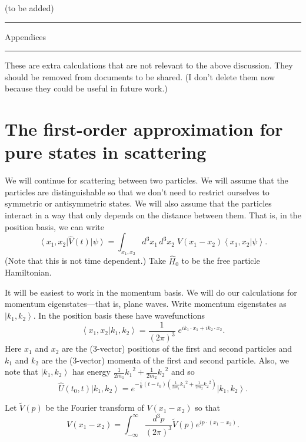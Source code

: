 \documentclass[11pt]{article}
\newcommand{\bra}[1]{\left\langle#1\right|}
\newcommand{\ket}[1]{\left|#1\right\rangle}
\newcommand{\braket}[2]{\left\langle#1|#2\right\rangle}
\newcommand{\op}[1]{\hat{#1}}
\theoremstyle{theorem}
\theoremstyle{remark}
\theoremstyle{step}
\theoremstyle{gap}
\begin{document}
(to be added)


\appendix
\newpage
\hrule
\vspace{3em}
{\Huge Appendices}
\vspace{3em}
\hrule
\vspace{2em}

These are extra calculations that are not relevant to the above discussion. They should be removed from documents to be shared. (I don't delete them now because they could be useful in future work.)


\section{The first-order approximation for pure states in scattering}

We will continue for scattering between two particles. We will assume that the particles are distinguishable so that we don't need to restrict ourselves to symmetric or antisymmetric states. We will also assume that the particles interact in a way that only depends on the distance between them. That is, in the position basis, we can write
\begin{equation}\label{eq.Vposbasis}
\bra{x_1, x_2}\op{V}(t)\ket{\psi} = \int_{x_1,x_2} {d^3 x_1 \,d^3x_2}\; V(x_1 - x_2) \braket{x_1, x_2}{\psi}.
\end{equation}
(Note that this is not time dependent.) Take \(\op{H}_0\) to be the free particle Hamiltonian.

It will be easiest to work in the momentum basis. We will do our calculations for momentum eigenstates---that is, plane waves. Write momentum eigenstates as \(\ket{k_1, k_2}\). In the position basis these have wavefunctions
\begin{equation}\label{eq.momentuminpos}
\braket{x_1, x_2}{k_1, k_2} = \frac{1}{(2\pi)^3}\;e^{ik_1\cdot x_1 + ik_2\cdot x_2}.
\end{equation}
Here \(x_1\) and \(x_2\) are the (3-vector) positions of the first and second particles and \(k_1\) and \(k_2\) are the (3-vector) momenta of the first and second particle. Also, we note that \(\ket{k_1, k_2}\) has energy \(\frac{1}{2m_1}{k_1}^2 + \frac{1}{2m_2}{k_2}^2\) and so
\begin{equation}
\label{eq.timeevonk}
\op{U}(t_0, t) \ket{k_1, k_2} = e^{-\frac{i}{\hbar}\left(t-t_0\right)\left(\frac{1}{2m_1}{k_1}^2 + \frac{1}{2m_2}{k_2}^2\right)} \ket{k_1, k_2}.
\end{equation}

Let \(\widetilde{V}(p)\) be the Fourier transform of \(V(x_1 - x_2)\) so that
\begin{equation}
\label{eq.ftV}
V(x_1 - x_2) = \int_{-\infty}^{\infty} \frac{d^3 p}{(2 \pi)^3} \widetilde{V}(p) e^{ip\cdot(x_1 - x_2)}.
\end{equation}
\end{document}
